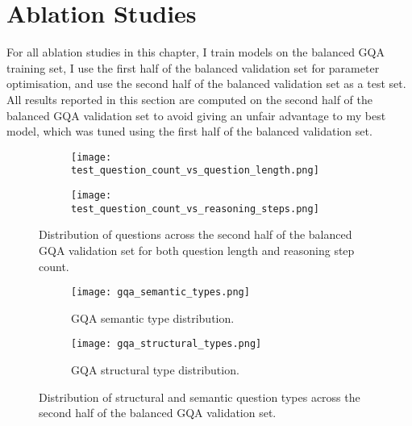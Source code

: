 \section{Ablation Studies}
\label{sec:ablation_studies}

For all ablation studies in this chapter, I train models on the balanced GQA training set, I use the first half of the balanced validation set for parameter optimisation, and use the second half of the balanced validation set as a test set. All results reported in this section are computed on the second half of the balanced GQA validation set to avoid giving an unfair advantage to my best model, which was tuned using the first half of the balanced validation set.

\begin{figure}[htbp]
    \centering
    \begin{subfigure}[l]{0.5\textwidth}
        \texttt{[image: test\_question\_count\_vs\_question\_length.png]}
        \label{fig:test_question_length_distribution}
    \end{subfigure}
    \begin{subfigure}[r]{0.49\textwidth}
        \texttt{[image: test\_question\_count\_vs\_reasoning\_steps.png]}
        \label{fig:test_reasoning_step_distribution}
    \end{subfigure}
    \caption{Distribution of questions across the second half of the balanced GQA validation set for both question length and reasoning step count.}
    \label{fig:test_reasoning_step_and_question_length_distribution}
\end{figure}

\begin{figure}[htbp]
    \centering
    \begin{subfigure}[l]{0.4\textwidth}
        \texttt{[image: gqa\_semantic\_types.png]}
        \label{fig:test_semantic_types}
        \caption{GQA semantic type distribution.}
    \end{subfigure}
    \begin{subfigure}[r]{0.4\textwidth}
        \texttt{[image: gqa\_structural\_types.png]}
        \label{fig:test_structural_types}
        \caption{GQA structural type distribution.}
    \end{subfigure}
    \caption{Distribution of structural and semantic question types across the second half of the balanced GQA validation set.}
    \label{fig:test_structural_and_semantic_distribution}
\end{figure}

